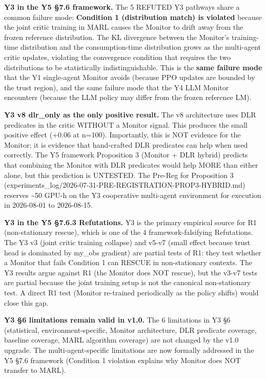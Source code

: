 \documentclass[
]{article}
\begin{document}
\textbf{Y3 in the Y5 §7.6 framework.} The 5 REFUTED Y3 pathways share a
common failure mode: \textbf{Condition 1 (distribution match) is
violated} because the joint critic training in MARL causes the Monitor
to drift away from the frozen reference distribution. The KL divergence
between the Monitor's training-time distribution and the
consumption-time distribution grows as the multi-agent critic updates,
violating the convergence condition that requires the two distributions
to be statistically indistinguishable. This is the \textbf{same failure
mode} that the Y1 single-agent Monitor avoids (because PPO updates are
bounded by the trust region), and the same failure mode that the Y4 LLM
Monitor encounters (because the LLM policy may differ from the frozen
reference LM).

\textbf{Y3 v8 dlr\_only as the only positive result.} The v8
architecture uses DLR predicates in the critic WITHOUT a Monitor signal.
This produces the small positive effect (+0.06 at n=100). Importantly,
this is NOT evidence for the Monitor; it is evidence that hand-crafted
DLR predicates can help when used correctly. The Y5 framework
Proposition 3 (Monitor + DLR hybrid) predicts that combining the Monitor
with DLR predicates would help MORE than either alone, but this
prediction is UNTESTED. The Pre-Reg for Proposition 3
(experiments\_log/2026-07-31-PRE-REGISTRATION-PROP3-HYBRID.md) reserves
\textasciitilde50 GPU-h on the Y3 cooperative multi-agent environment
for execution in 2026-08-01 to 2026-08-15.

\textbf{Y3 in the Y5 §7.6.3 Refutations.} Y3 is the primary empirical
source for R1 (non-stationary rescue), which is one of the 4
framework-falsifying Refutations. The Y3 v3 (joint critic training
collapse) and v5-v7 (small effect because trust head is dominated by
my\_obs gradient) are partial tests of R1: they test whether a Monitor
that fails Condition 1 can RESCUE in non-stationary contexts. The Y3
results argue against R1 (the Monitor does NOT rescue), but the v3-v7
tests are partial because the joint training setup is not the canonical
non-stationary test. A direct R1 test (Monitor re-trained periodically
as the policy shifts) would close this gap.

\textbf{Y3 §6 limitations remain valid in v1.0.} The 6 limitations in Y3
§6 (statistical, environment-specific, Monitor architecture, DLR
predicate coverage, baseline coverage, MARL algorithm coverage) are not
changed by the v1.0 upgrade. The multi-agent-specific limitations are
now formally addressed in the Y5 §7.6 framework (Condition 1 violation
explains why Monitor does NOT transfer to MARL).
\end{document}
